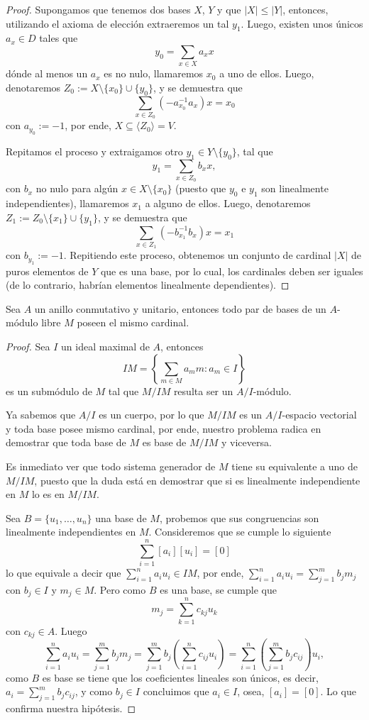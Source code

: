 \documentclass[11pt,oneside]{book}
\begin{document}
\begin{proof}
Supongamos que tenemos dos bases $X$, $Y$ y que $|X|\leq|Y|$, entonces, utilizando el axioma de elección extraeremos un tal $y_1$. Luego, existen unos únicos $a_x\in D$ tales que
$$y_0=\sum_{x\in X}a_x x$$
dónde al menos un $a_x$ es no nulo, llamaremos $x_0$ a uno de ellos. Luego, denotaremos $Z_0:=X\setminus\{x_0\}\cup\{y_0\}$, y se demuestra que
$$\sum_{x\in Z_0}(-a_{x_0}^{-1}a_x)x=x_0$$
con $a_{y_0}:=-1$, por ende, $X\subseteq\langle Z_0\rangle=V$.

Repitamos el proceso y extraigamos otro $y_1\in Y\setminus\{y_0\}$, tal que
$$y_1=\sum_{x\in Z_0}b_x x,$$
con $b_x$ no nulo para algún $x\in X\setminus\{x_0\}$ (puesto que $y_0$ e $y_1$ son linealmente independientes), llamaremos $x_1$ a alguno de ellos. Luego, denotaremos $Z_1:=Z_0\setminus\{x_1\}\cup\{y_1\}$, y se demuestra que
$$\sum_{x\in Z_1}(-b_{x_1}^{-1}b_x)x=x_1$$
con $b_{y_1}:=-1$. Repitiendo este proceso, obtenemos un conjunto de cardinal $|X|$ de puros elementos de $Y$ que es una base, por lo cual, los cardinales deben ser iguales (de lo contrario, habrían elementos linealmente dependientes).
\end{proof}
\begin{thm}
Sea $A$ un anillo conmutativo y unitario, entonces todo par de bases de un $A$-módulo libre $M$ poseen el mismo cardinal.
\end{thm}
\begin{proof}
Sea $I$ un ideal maximal de $A$, entonces
$$IM=\left\{\sum_{m\in M}a_mm:a_m\in I\right\}$$
es un submódulo de $M$ tal que $M/IM$ resulta ser un $A/I$-módulo.

Ya sabemos que $A/I$ es un cuerpo, por lo que $M/IM$ es un $A/I$-espacio vectorial y toda base posee mismo cardinal, por ende, nuestro problema radica en demostrar que toda base de $M$ es base de $M/IM$ y viceversa.

Es inmediato ver que todo sistema generador de $M$ tiene su equivalente a uno de $M/IM$, puesto que la duda está en demostrar que si es linealmente independiente en $M$ lo es en $M/IM$.

Sea $B=\{u_1,\dots,u_n\}$ una base de $M$, probemos que sus congruencias son linealmente independientes en $M$. Consideremos que se cumple lo siguiente
$$\sum_{i=1}^n[a_i][u_i]=[0]$$
lo que equivale a decir que $\sum_{i=1}^n a_iu_i\in IM$, por ende, $\sum_{i=1}^n a_iu_i=\sum_{j=1}^m b_jm_j$ con $b_j\in I$ y $m_j\in M$. Pero como $B$ es una base, se cumple que
$$m_j=\sum_{k=1}^n c_{kj}u_k$$
con $c_{kj}\in A$. Luego
$$\sum_{i=1}^n a_iu_i=\sum_{j=1}^m b_jm_j=\sum_{j=1}^m b_j\left(\sum_{i=1}^n c_{ij}u_i\right)=\sum_{i=1}^n\left(\sum_{j=1}^m b_jc_{ij}\right)u_i,$$
como $B$ es base se tiene que los coeficientes lineales son únicos, es decir, $a_i=\sum_{j=1}^m b_jc_{ij}$, y como $b_j\in I$ concluimos que $a_i\in I$, osea, $[a_i]=[0]$. Lo que confirma nuestra hipótesis.
\end{proof}
\end{document}
